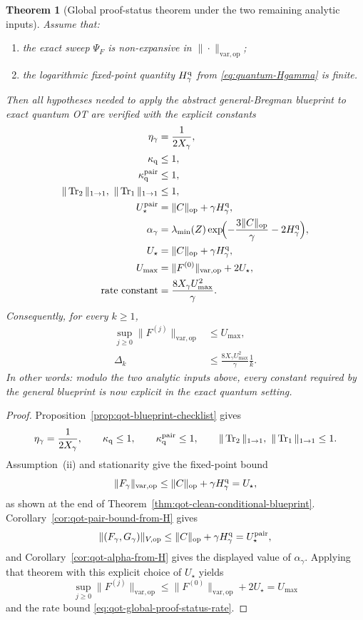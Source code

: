 \documentclass[11pt]{article}
\newcommand{\Trone}{\operatorname{Tr}_{1}}
\newcommand{\Trtwo}{\operatorname{Tr}_{2}}
\newcommand{\op}{\mathrm{op}}
\newcommand{\varop}{\mathrm{var},\op}
\theoremstyle{plain}
\newtheorem{theorem}{Theorem}[section]
\begin{document}
\begin{theorem}[Global proof-status theorem under the two remaining analytic inputs]
\label{thm:qot-global-proof-status}
Assume that:
\begin{enumerate}[label=\textnormal{(\roman*)}]
\item the exact sweep $\Psi_F$ is non-expansive in $\|\cdot\|_{\varop}$;
\item the logarithmic fixed-point quantity $H_\gamma^{\rm q}$ from \eqref{eq:quantum-Hgamma} is finite.
\end{enumerate}
Then all hypotheses needed to apply the abstract general-Bregman blueprint to exact quantum OT are verified with the explicit constants
\begin{align*}
\eta_\gamma &= \frac{1}{2X_\gamma},\\
\kappa_{\rm q} &\le 1,\\
\kappa_{\rm q}^{\rm pair} &\le 1,\\
\|\Trtwo\|_{1\to 1},\ \|\Trone\|_{1\to 1} &\le 1,\\
U_\star^{\rm pair} &= \|C\|_{\op}+\gamma H_\gamma^{\rm q},\\
\alpha_\gamma
&=
\lambda_{\min}(Z)\exp\!\Bigl(
-\frac{3\|C\|_{\op}}{\gamma}
-2H_\gamma^{\rm q}
\Bigr),\\
U_\star &= \|C\|_{\op}+\gamma H_\gamma^{\rm q},\\
U_{\max} &= \|F^{(0)}\|_{\varop}+2U_\star,\\
\text{rate constant} &= \frac{8X_\gamma U_{\max}^2}{\gamma}.
\end{align*}
Consequently, for every $k\ge 1$,
\begin{align}
\sup_{j\ge 0}\|F^{(j)}\|_{\varop}
&\le
U_{\max},
\label{eq:qot-global-proof-status-bound}\\
\Delta_k
&\le
\frac{8X_\gamma U_{\max}^2}{\gamma}\frac{1}{k}.
\label{eq:qot-global-proof-status-rate}
\end{align}
In other words: modulo the two analytic inputs above, every constant required by the general blueprint is now explicit in the exact quantum setting.
\end{theorem}

\begin{proof}
Proposition~\ref{prop:qot-blueprint-checklist} gives
\[
\eta_\gamma=\frac{1}{2X_\gamma},
\qquad
\kappa_{\rm q}\le 1,
\qquad
\kappa_{\rm q}^{\rm pair}\le 1,
\qquad
\|\Trtwo\|_{1\to 1},\ \|\Trone\|_{1\to 1}\le 1.
\]
Assumption~(ii) and stationarity give the fixed-point bound
\[
\|F_\gamma\|_{\varop}\le \|C\|_{\op}+\gamma H_\gamma^{\rm q}=U_\star,
\]
as shown at the end of Theorem~\ref{thm:qot-clean-conditional-blueprint}.
Corollary~\ref{cor:qot-pair-bound-from-H} gives
\[
\|(F_\gamma,G_\gamma)\|_{V,\op}\le \|C\|_{\op}+\gamma H_\gamma^{\rm q}=U_\star^{\rm pair},
\]
and Corollary~\ref{cor:qot-alpha-from-H} gives the displayed value of $\alpha_\gamma$.
Applying that theorem with this explicit choice of $U_\star$ yields
\[
\sup_{j\ge 0}\|F^{(j)}\|_{\varop}
\le
\|F^{(0)}\|_{\varop}+2U_\star
=
U_{\max}
\]
and the rate bound \eqref{eq:qot-global-proof-status-rate}.
\end{proof}
\end{document}
